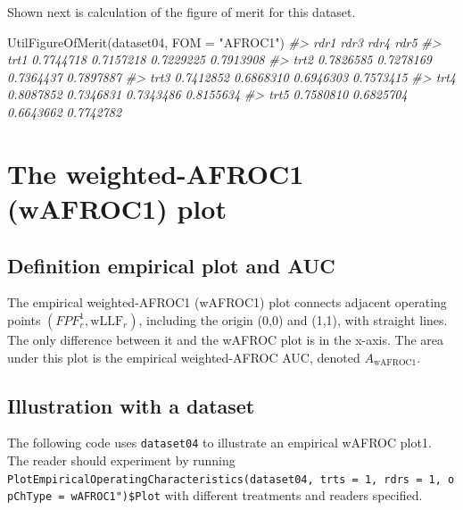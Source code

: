 \documentclass[
]{book}
\newenvironment{Shaded}{\begin{snugshade}}{\end{snugshade}}
\newcommand{\AttributeTok}[1]{\textcolor[rgb]{0.77,0.63,0.00}{#1}}
\newcommand{\CommentTok}[1]{\textcolor[rgb]{0.56,0.35,0.01}{\textit{#1}}}
\newcommand{\FunctionTok}[1]{\textcolor[rgb]{0.00,0.00,0.00}{#1}}
\newcommand{\NormalTok}[1]{#1}
\newcommand{\StringTok}[1]{\textcolor[rgb]{0.31,0.60,0.02}{#1}}
\begin{document}
Shown next is calculation of the figure of merit for this dataset.

\begin{Shaded}
\begin{Highlighting}[]
\FunctionTok{UtilFigureOfMerit}\NormalTok{(dataset04, }\AttributeTok{FOM =} \StringTok{"AFROC1"}\NormalTok{)}
\CommentTok{\#\textgreater{}           rdr1      rdr3      rdr4      rdr5}
\CommentTok{\#\textgreater{} trt1 0.7744718 0.7157218 0.7229225 0.7913908}
\CommentTok{\#\textgreater{} trt2 0.7826585 0.7278169 0.7364437 0.7897887}
\CommentTok{\#\textgreater{} trt3 0.7412852 0.6868310 0.6946303 0.7573415}
\CommentTok{\#\textgreater{} trt4 0.8087852 0.7346831 0.7343486 0.8155634}
\CommentTok{\#\textgreater{} trt5 0.7580810 0.6825704 0.6643662 0.7742782}
\end{Highlighting}
\end{Shaded}

\hypertarget{froc-empirical-wAFROC1}{%
\section{The weighted-AFROC1 (wAFROC1) plot}\label{froc-empirical-wAFROC1}}

\hypertarget{froc-empirical-definition-empirical-auc-wafroc1}{%
\subsection{Definition empirical plot and AUC}\label{froc-empirical-definition-empirical-auc-wafroc1}}

The empirical weighted-AFROC1 (wAFROC1) plot connects adjacent operating points \(\left ( FPF_r^1, \text{wLLF}_r \right )\), including the origin (0,0) and (1,1), with straight lines. The only difference between it and the wAFROC plot is in the x-axis. The area under this plot is the empirical weighted-AFROC AUC, denoted \(A_{\text{wAFROC1}}\).

\hypertarget{froc-empirical-wafroc1-plot-illustration}{%
\subsection{Illustration with a dataset}\label{froc-empirical-wafroc1-plot-illustration}}

The following code uses \texttt{dataset04} to illustrate an empirical wAFROC plot1. The reader should experiment by running \texttt{PlotEmpiricalOperatingCharacteristics(dataset04,\ trts\ =\ 1,\ rdrs\ =\ 1,\ opChType\ =\ wAFROC1")\$Plot} with different treatments and readers specified.
\end{document}
